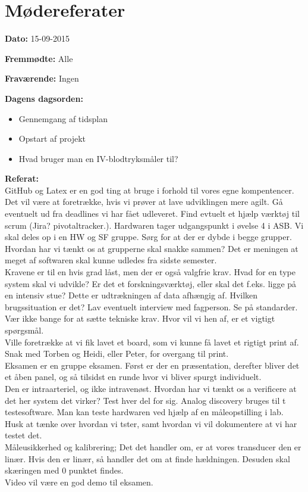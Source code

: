 \chapter{Mødereferater}
\textbf{Dato:} 15-09-2015

\textbf{Fremmødte:} Alle

\textbf{Fraværende:} Ingen

\textbf{Dagens dagsorden:}
\begin{itemize}
	\item Gennemgang af tidsplan
	\item Opstart af projekt
	\item Hvad bruger man en IV-blodtryksmåler til? 
\end{itemize}

\textbf{Referat:}
\\ GitHub og Latex er en god ting at bruge i forhold til vores egne kompentencer. 
\\ Det vil være at foretrække, hvis vi prøver at lave udviklingen mere agilt. Gå eventuelt ud fra deadlines vi har fået udleveret. Find evtuelt et hjælp værktøj til scrum (Jira? pivotaltracker.). Hardwaren tager udgangspunkt i øvelse 4 i ASB. Vi skal deles op i en HW og SF gruppe. Sørg for at der er dybde i begge grupper. Hvordan har vi tænkt os at grupperne skal snakke sammen? Det er meningen at meget af softwaren skal kunne udledes fra sidste semester. 
\\Kravene er til en hvis grad låst, men der er også valgfrie krav. Hvad for en type system skal vi udvikle? Er det et forskningsværktøj, eller skal det f.eks. ligge på en intensiv stue? Dette er udtrækningen af data afhængig af. Hvilken brugssituation er det? Lav eventuelt interview med fagperson. Se på standarder. Vær ikke bange for at sætte tekniske krav. Hvor vil vi hen af, er et vigtigt spørgsmål.
\\Ville foretrække at vi fik lavet et board, som vi kunne få lavet et rigtigt print af. Snak med Torben og Heidi, eller Peter, for overgang til print. 
\\Eksamen er en gruppe eksamen. Først er der en præsentation, derefter bliver det et åben panel, og så tilsidst en runde hvor vi bliver spurgt individuelt. 
\\Den er intraarteriel, og ikke intravenøst. Hvordan har vi tænkt os a verificere at det her system det virker? Test hver del for sig. Analog discovery bruges til t testesoftware. Man kan teste hardwaren ved hjælp af en måleopstilling i lab. Husk at tænke over hvordan vi tster, samt hvordan vi vil dokumentere at vi har testet det. 
\\Måleusikkerhed og kalibrering; Det det handler om, er at vores transducer den er linær. Hvis den er linær, så handler det om at finde hældningen. Desuden skal skæringen med 0 punktet findes. 
\\Video vil være en god demo til eksamen. 
